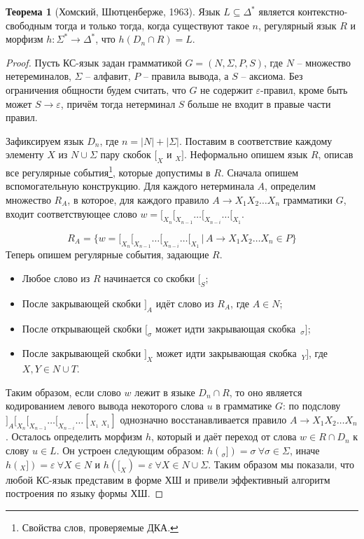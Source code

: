 \documentclass[12pt]{article}
\theoremstyle{definiton}
\theoremstyle{definition}
\newtheorem*{known}{Теорема}
\theoremstyle{definition}
\let\eps\varepsilon
\begin{document}
\begin{known}[Хомский, Шютценберже, 1963]
	Язык $L \subseteq \Delta^*$ является контекстно-свободным тогда и только тогда, когда
	существуют такое $n$, регулярный язык $R$ и морфизм $h : \Sigma^* \to \Delta^*$, что  $ h(D_n\cap R) = L$.

	
\end{known}
\begin{proof}
	
	Пусть КС-язык задан грамматикой $G = (N,\Sigma,P,S)$, где $N$ -- множество нетереминалов, $\Sigma$ -- алфавит, $P$ -- правила вывода, а $S$ -- аксиома. Без ограничения общности будем считать, что $G$ не содержит $\eps$-правил, кроме быть может $S \to \eps$, причём тогда нетерминал $S$ больше не входит в правые части правил.
	
	
	Зафиксируем язык $D_n$, где $n = |N| + |\Sigma|$. Поставим в соответствие каждому элементу  $X $ из $ N\cup \Sigma$  пару скобок $[_X$ и $_X]$. Неформально опишем язык $R$, описав все регулярные события\footnote{Свойства слов, проверяемые ДКА.}, которые допустимы в $R$.  Сначала опишем вспомогательную конструкцию. Для каждого нетерминала $A$, определим множество $R_A $, в которое, для каждого правило  $A \to X_1X_2\ldots X_n$ грамматики $G$, входит соответствующее слово $w = [_{X_n}[_{X_{n-1}}\ldots[_{X_{n-i}}\ldots[_{X_1}$.  
	
	$$
		R_A = \{ w = [_{X_n}[_{X_{n-1}}\ldots[_{X_{n-i}}\ldots[_{X_1} \,|\, A \to X_1X_2\ldots X_n \in P \}
	$$
	\newpage
	Теперь опишем регулярные события, задающие $R$.
	\begin{itemize}
		\item Любое слово из $R$ начинается со скобки $[_S$;
		\item После закрывающей скобки $]_A$ идёт слово из $R_A$, где $A \in N$;
		\item После открывающей скобки $[_\sigma $ может идти закрывающая скобка $ \,_\sigma]$;
		\item После закрывающей скобки $]_X $ может идти закрывающая скобка $ \,_Y]$, где $X, Y \in N\cup T$.
	\end{itemize}
	 
	
	Таким образом, если слово $w$ лежит в языке $D_n\cap R$, то оно является кодированием левого вывода некоторого слова $u$ в грамматике $G$: по подслову $]_A[_{X_n}[_{X_{n-1}}\ldots[_{X_{n-i}}\ldots[_{X_1}\ _{X_1}]$ однозначно восстанавливается правило $A \to X_1X_2\ldots X_n$.  Осталось определить морфизм $h$, который и даёт переход от слова $w \in R\cap D_n$ к слову $u \in L$. Он устроен следующим образом:
	$h(_\sigma]) = \sigma\ \forall \sigma \in \Sigma$, иначе $h(_X]) = \eps\ \forall X \in N$ и $h([_X) = \eps\ \forall X \in N\cup \Sigma$. Таким образом мы показали, что любой КС-язык представим в форме ХШ и привели эффективный алгоритм построения по языку формы ХШ.
	

\end{proof}
\end{document}
